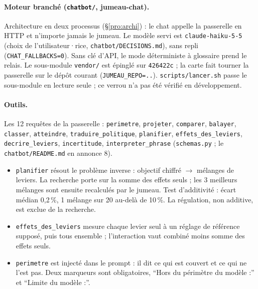 \paragraph{Moteur branché (\texttt{chatbot/\allowbreak{}}, jumeau-chat).}
Architecture en deux processus (§\ref{pro:archi}) : le chat appelle la passerelle en HTTP et n'importe jamais le jumeau.
Le modèle servi est \texttt{claude-\allowbreak{}haiku-\allowbreak{}5-\allowbreak{}5} (choix de l'utilisateur·rice, \texttt{chatbot/\allowbreak{}DECISIONS.md}), sans repli (\texttt{CHAT\_\allowbreak{}FALLBACKS=0}). Sans clé d'API, le mode déterministe à glossaire prend le relais.
Le sous-module \texttt{vendor/\allowbreak{}} est épinglé sur \texttt{426422c} ; la carte fait tourner la passerelle sur le dépôt courant (\texttt{JUMEAU\_\allowbreak{}REPO=..}). \texttt{scripts/\allowbreak{}lancer.sh} passe le sous-module en lecture seule ; ce verrou n'a pas été vérifié en développement.

\paragraph{Outils.}
Les 12\mesure{} requêtes de la passerelle : \texttt{perimetre}, \texttt{projeter}, \texttt{comparer}, \texttt{balayer}, \texttt{classer}, \texttt{atteindre}, \texttt{traduire\_\allowbreak{}politique}, \texttt{planifier}, \texttt{effets\_\allowbreak{}des\_\allowbreak{}leviers}, \texttt{decrire\_\allowbreak{}leviers}, \texttt{incertitude}, \texttt{interpreter\_\allowbreak{}phrase} (\texttt{schemas.py} ; le \texttt{chatbot/\allowbreak{}README.md} en annonce 8\mesure{}).
\begin{itemize}
\item \texttt{planifier} résout le problème inverse : objectif chiffré $\rightarrow$ mélanges de leviers. La recherche porte sur la somme des effets seuls ; les 3\mesure{} meilleurs mélanges sont ensuite recalculés par le jumeau. Test d'additivité : écart médian 0,2\mesure{}\,\%, 1\mesure{} mélange sur 20\mesure{} au-delà de 10\,\%. La régulation, non additive, est exclue de la recherche.
\item \texttt{effets\_\allowbreak{}des\_\allowbreak{}leviers} mesure chaque levier seul à un réglage de référence supposé, puis tous ensemble ; l'interaction vaut combiné moins somme des effets seuls.
\item \texttt{perimetre} est injecté dans le prompt : il dit ce qui est couvert et ce qui ne l'est pas. Deux marqueurs sont obligatoires, \enquote{Hors du périmètre du modèle :} et \enquote{Limite du modèle :}.
\end{itemize}

